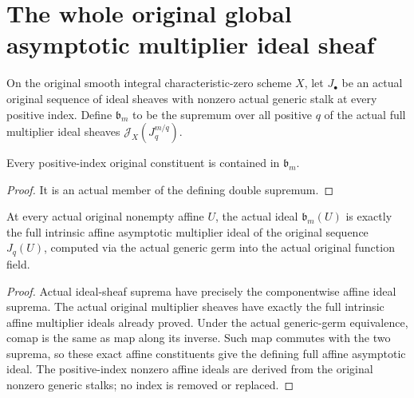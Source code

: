 \section{The whole original global asymptotic multiplier ideal sheaf}

\begin{definition}\label{def:sc0-original-global-asymptotic-multiplier-ideal}
\leanok
{}
On the original smooth integral characteristic-zero scheme $X$,
let $J_\bullet$ be an actual original sequence of ideal sheaves with
nonzero actual generic stalk at every positive index. Define
$\mathfrak b_m$ to be the supremum over all positive $q$ of the
actual full multiplier ideal sheaves $\mathcal J_X(J_q^{m/q})$.
\end{definition}

\begin{lemma}\label{lem:sc0-original-global-asymptotic-constituent}
\leanok
{}
Every positive-index original constituent is contained in $\mathfrak b_m$.
\end{lemma}
\begin{proof}
It is an actual member of the defining double supremum.
\end{proof}

\begin{theorem}\label{thm:sc0-original-global-asymptotic-affine-values}
\leanok
{}
At every actual original nonempty affine $U$, the actual ideal
$\mathfrak b_m(U)$ is exactly the full intrinsic affine asymptotic
multiplier ideal of the original sequence $J_q(U)$, computed via
the actual generic germ into the actual original function field.
\end{theorem}
\begin{proof}
Actual ideal-sheaf suprema have precisely the componentwise affine
ideal suprema. The actual original multiplier sheaves have exactly
the full intrinsic affine multiplier ideals already proved. Under
the actual generic-germ equivalence, comap is the same as map along
its inverse. Such map commutes with the two suprema, so these exact
affine constituents give the defining full affine asymptotic ideal.
The positive-index nonzero affine ideals are derived from the
original nonzero generic stalks; no index is removed or replaced.
\end{proof}

